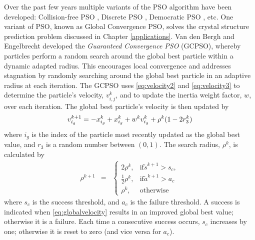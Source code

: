 Over the past few years multiple variants of the PSO algorithm have been developed: Collision-free PSO \cite{Krink2002}, Discrete PSO \cite{Kennedy1997}, Democratic PSO \cite{Kaveh2014}, etc. One variant of PSO, known as Global Convergence PSO, solves the crystal structure prediction problem discussed in Chapter \ref{applications}. Van den Bergh and Engelbrecht \cite{Van2002} developed the \textit{Guaranteed Convergence PSO} (GCPSO), whereby particles perform a random search around the global best particle within a dynamic adapted radius.
This encourages local convergence and addresses stagnation by randomly searching around the global best particle in an adaptive radius at each iteration. The GCPSO uses \eqref{eq:velocity2} and \eqref{eq:velocity3} to determine the particle's velocity, $v^k_{i,j}$, and to update the inertia weight factor, $w$, over each iteration. The global best particle's velocity is then updated by
\begin{equation}
    \label{eq:globalvelocity}
    v^{k+1}_{i_g} = -x^k_{i_g} + x^k_{i_g} + w^k v^k_{i_g} + \rho^k(1-2r^k_3) \\
\end{equation}
where $i_g$ is the index of the particle most recently updated as the global best value, and $r_3$ is a random number between $(0,1)$. The search radius, $\rho^k$, is calculated by
\begin{eqnarray}
    \rho^{k+1} & = &
    \begin{cases}
        2\rho^k, &\text{if} \check{s}^{k+1} > s_c,\\
        \frac{1}{2}\rho^k, &\text{if} \check{a}^{k+1}>a_c\\
        \rho^k, & \mbox{otherwise}
    \end{cases}
    \label{eq:rho}
\end{eqnarray}
where $s_c$ is the success threshold, and $a_c$ is the failure threshold. A success is indicated when \eqref{eq:globalvelocity} results in an improved global best value; otherwise it is a failure. Each time a consecutive success occurs, $s_c$ increases by one; otherwise it is reset to zero (and vice versa for $a_c$). 

    


